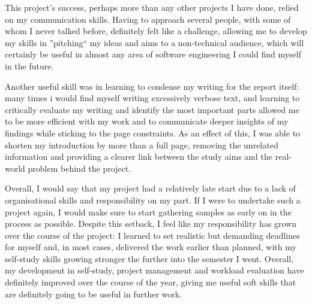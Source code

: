 \documentclass[12pt]{article}
\begin{document}
    This project's success, perhaps more than any other projects I have done, relied on my communication skills.
    Having to approach several people, with some of whom I never talked before, definitely felt like a challenge, allowing me to
    develop my skills in ''pitching`` my ideas and aims to a non-technical audience, which will certainly be useful in almost any area
    of software engineering I could find myself in the future.

    Another useful skill was in learning to condense my writing for the report itself: many times i would find myself
    writing excessively verbose text, and learning to critically evaluate my writing and identify the most important parts
    allowed me to be more efficient with my work and to communicate deeper insights of my findings while sticking to the page
    constraints.
    As an effect of this, I was able to shorten my introduction by more than a full page, removing the unrelated information and
    providing a clearer link between the study aims and the real-world problem behind the project.

    Overall, I would say that my project had a relatively late start due to a lack of organisational skills and responsibility on my part.
    If I were to undertake such a project again, I would make sure to start gathering samples as early on in the process as possible.
    Despite this setback, I feel like my responsibility has grown over the course of the project: I learned to set realistic but
    demanding deadlines for myself and, in most cases, delivered the work earlier than planned, with my self-study skills growing stronger
    the further into the semester I went.
    Overall, my development in self-study, project management and workload evaluation have definitely improved over the course of the year,
    giving me useful soft skills that are definitely going to be useful in further work.
\end{document}
